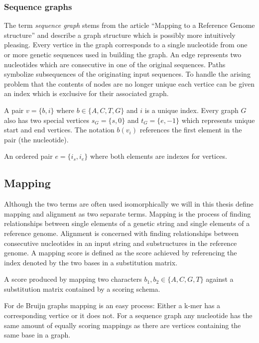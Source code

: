 \documentclass[thesis.tex]{subfiles}
\begin{document}
\subsubsection{Sequence graphs}
The term \textit{sequence graph} stems from the article ``Mapping to a Reference Genome structure''\cite{mapping_to_a_reference_genome_structure} and describe a graph structure which is possibly more intuitively pleasing. Every vertice in the graph corresponds to a single nucleotide from one or more genetic sequences used in building the graph. An edge represents two nucleotides which are consecutive in one of the original sequences. Paths symbolize subsequences of the originating input sequences. To handle the arising problem that the contents of nodes are no longer unique each vertice can be given an index which is exclusive for their associated graph. \\
\begin{defn}[Vertice]
  A pair $v=\{b, i\}$ where $b \in \{A, C, T, G\}$ and $i$ is a unique index. Every graph $G$ also has two special vertices $s_G=\{s, 0\}$ and $t_G=\{e, -1\}$ which represents unique start and end vertices. The notation $b(v_i)$ references the first element in the pair (the nucleotide).
\end{defn}
\begin{defn}[Edge]
  An ordered pair $e=\{i_s, i_e\}$ where both elements are indexes for vertices. 
\end{defn}
\subsection{Mapping}
Although the two terms are often used isomorphically we will in this thesis define mapping and alignment as two separate terms. Mapping is the process of finding relationships between single elements of a genetic string and single elements of a reference genome. Alignment is concerned with finding relationships between consecutive nucleotides in an input string and substructures in the reference genome. A mapping score is defined as the score achieved by referencing the index denoted by the two bases in a substitution matrix. 
\begin{defn}
  A score produced by mapping two characters $b_1, b_2 \in \{A, C, G, T\}$ against a substitution matrix contained by a scoring schema.
\end{defn}
\noindent
For de Bruijn graphs mapping is an easy process: Either a k-mer has a corresponding vertice or it does not. For a sequence graph any nucleotide has the same amount of equally scoring mappings as there are vertices containing the same base in a graph.
\end{document}

